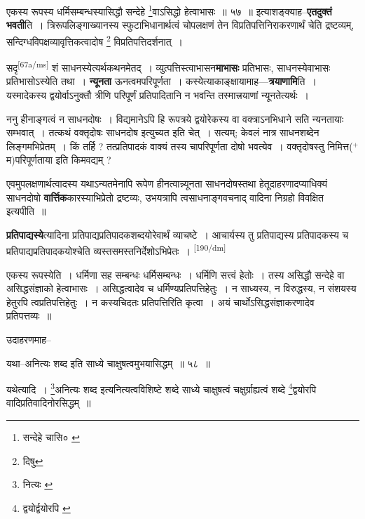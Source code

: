 \documentclass[article,12pt,a4paper]{memoir}
\newcommand{\add}[1]{($^{+}$#1)}
\begin{document}
	एकस्य रूपस्य धर्मिसम्बन्धस्यासिद्धौ सन्देहे \footnote{सन्देहे चासि० \cite{dp-msB} \cite{dp-msC} \cite{dp-msD} \cite{dp-edP} \cite{dp-edH} \cite{dp-edE}}वाऽसिद्धो हेत्वाभासः ॥ ५७ ॥ इत्याशङ्क्याह--\textbf{एतदुक्तं भवती}ति । त्रिरूपलिङ्गाख्यानस्य स्फुटाभिधानार्थत्वं चोपलक्षणं तेन विप्रतिपत्तिनिराकरणार्थं चेति द्रष्टव्यम्, सन्दिग्धविपक्षव्यावृत्तिकत्वादोष \footnote{दिषु} विप्रतिपत्तिदर्शनात् ।
	\pend
      

	  \pstart सदृ\leavevmode\textsuperscript{\rmlatinfont\tiny [67a/ms]} शं साधनस्येत्यर्थकथनमेतद् । व्युत्पत्तिस्त्वाभासन\textbf{माभासः} प्रतिभासः, साधनस्येवाभासः प्रतिभासोऽस्येति तथा । \textbf{न्यूनता} ऊनत्वमपरिपूर्णता । कस्येत्याकाङ्क्षायामाह—\textbf{त्रयाणामि}ति । यस्मादेकस्य द्वयोर्वाऽनुक्तौ त्रीणि परिपूर्णं प्रतिपादितानि न भवन्ति तस्मात्त्रयाणां न्यूनतेत्यर्थः ।
	\pend
      

	  \pstart ननु हीनाङ्गत्वं न साधनदोषः । विद्यमानेऽपि हि रूपत्रये द्वयोरेकस्य वा वक्त्राऽनभिधाने सति न्यनतायाः सम्भवात् । तत्कथं वक्तृदोषः साधनदोष इत्युच्यत इति चेत् । सत्यम्; केवलं नात्र साधनशब्देन लिङ्गमभिप्रेतम् । किं तर्हि ? तत्प्रतिपादकं वाक्यं तस्य चापरिपूर्णता दोषो भवत्येव । वक्तृदोषस्तु निमित्त\add{म}परिपूर्णताया इति किमवद्यम् ?
	\pend
      

	  \pstart एवमुपलक्षणार्थत्वादस्य यथाऽन्यतमेनापि रूपेण हीनत्वान्न्यूनता साधनदोषस्तथा हेतूदाहरणादप्याधिक्यं साधनदोषो \textbf{वार्त्तिक}कारस्याभिप्रेतो द्रष्टव्यः, उभयत्रापि त्वसाधनाङ्गवचनाद् वादिना निग्रहो विवक्षित इत्यपीति ॥
	\pend
      

	  \pstart \textbf{प्रतिपाद्यस्ये}त्यादिना प्रतिपाद्यप्रतिपादकशब्दयोरेवार्थं व्याचष्टे । आचार्यस्य तु प्रतिपाद्यस्य प्रतिपादकस्य च प्रतिपाद्यप्रतिपादकयोश्चेति व्यस्तसमस्तनिर्देशोऽभिप्रेतः ।
	\pend
      \leavevmode\textsuperscript{\rmlatinfont\tiny [190/dm]}

	  \pstart एकस्य रूपस्येति । धर्मिणा सह सम्बन्धः धर्मिसम्बन्धः । धर्मिणि सत्त्वं हेतोः । तस्य असिद्धौ सन्देहे वा असिद्धसंज्ञाको हेत्वाभासः । असिद्धत्वादेव च धर्मिण्यप्रतिपत्तिहेतुः । न साध्यस्य, न विरुद्धस्य, न संशयस्य हेतुरपि त्वप्रतिपत्तिहेतुः । न कस्यचिदतः प्रतिपत्तिरिति कृत्वा । अयं चार्थोऽसिद्धसंज्ञाकरणादेव प्रतिपत्तव्यः ॥
	\pend
       

	  \pstart उदाहरणमाह--
	\pend
       

	  \pstart यथा--अनित्यः शब्द इति साध्ये चाक्षुषत्वमुभयासिद्धम् ॥ ५८ ॥
	\pend
       

	  \pstart यथेत्यादि । \footnote{नित्यः \cite{dp-msB}}अनित्यः शब्द इत्यनित्यत्वविशिष्टे शब्दे साध्ये चाक्षुषत्वं चक्षुर्ग्राह्यत्वं शब्दे \footnote{द्वयोर्द्वयोरपि \cite{dp-msB}}द्वयोरपि वादिप्रतिवादिनोरसिद्धम् ॥
	\pend
       
\end{document}
